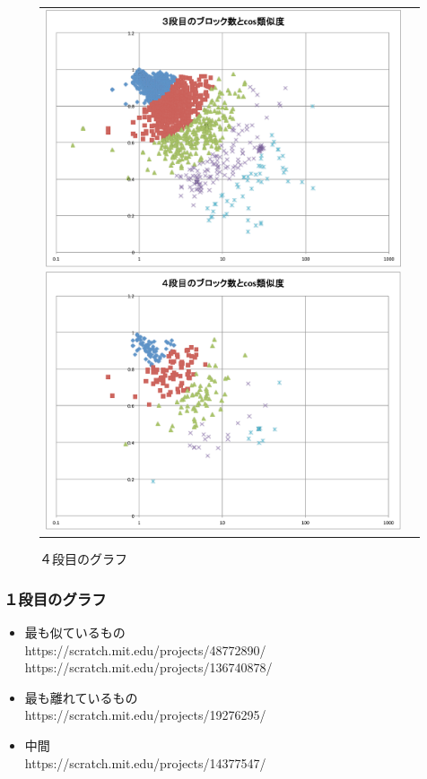 \documentclass[a4paper,10pt,onecolumn,oneside,openany]{jsbook}
\begin{document}
\begin{figure}[h]
\begin{tabular}{cc}
\begin{minipage}[t]{0.45\hsize}
	 \centering
	 \includegraphics[keepaspectratio, scale = 0.25]{graph_third_block.pdf}
	 \caption{３段目のグラフ}
	 \label{third_block}
	\end{minipage}
        \begin{minipage}[t]{0.45\hsize}
	 \centering
	 \includegraphics[keepaspectratio, scale = 0.25]{graph_fourth_block.pdf}
	 \caption{４段目のグラフ}
	 \label{fourth_block}
	\end{minipage}
 \end{tabular}
 \end{figure}
 

\subsubsection{１段目のグラフ}
\begin{itemize}
\item 最も似ているもの
\\https://scratch.mit.edu/projects/48772890/
\\https://scratch.mit.edu/projects/136740878/
\item 最も離れているもの
\\https://scratch.mit.edu/projects/19276295/
\item 中間
\\https://scratch.mit.edu/projects/14377547/
\end{itemize}
\end{document}
